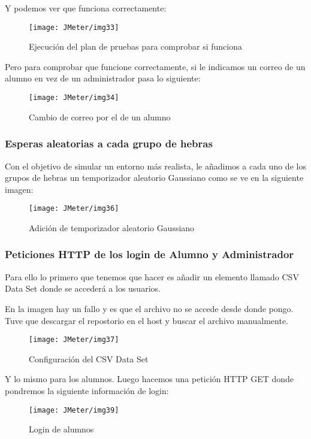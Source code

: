 Y podemos ver que funciona correctamente:

\begin{figure}[H]
    \centering
    \texttt{[image: JMeter/img33]}
    \caption{Ejecución del plan de pruebas para comprobar si funciona}
\end{figure}

Pero para comprobar que funcione correctamente, si le indicamos un correo de un alumno en vez de un administrador pasa lo siguiente:

\begin{figure}[H]
    \centering
    \texttt{[image: JMeter/img34]}
    \caption{Cambio de correo por el de un alumno}
\end{figure}

\subsubsection{Esperas aleatorias a cada grupo de hebras}

Con el objetivo de simular un entorno más realista, le añadimos a cada uno de los grupos de hebras un temporizador aleatorio Gaussiano como se ve en la siguiente imagen:

\begin{figure}[H]
    \centering
    \texttt{[image: JMeter/img36]}
    \caption{Adición de temporizador aleatorio Gaussiano}
\end{figure}

\newpage
\subsubsection{Peticiones HTTP de los login de Alumno y Administrador}

Para ello lo primero que tenemos que hacer es añadir un elemento llamado CSV Data Set donde se accederá a los usuarios.

En la imagen hay un fallo y es que el archivo no se accede desde donde pongo. Tuve que descargar el repostorio en el host y buscar el archivo manualmente.
\begin{figure}[H]
    \centering
    \texttt{[image: JMeter/img37]}
    \caption{Configuración del CSV Data Set}
\end{figure}

Y lo mismo para los alumnos. Luego hacemos una petición HTTP GET donde pondremos la siguiente información de login:

\begin{figure}[H]
    \centering
    \texttt{[image: JMeter/img39]}
    \caption{Login de alumnos}
\end{figure}

